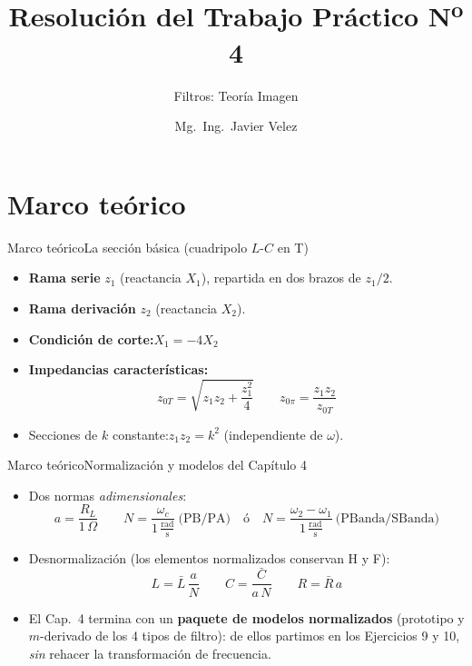 \documentclass[10pt, aspectratio=169]{beamer}
\title{Resolución del Trabajo Práctico N\textsuperscript{o} 4}
\subtitle{Filtros: Teoría Imagen}
\author{Mg.\ Ing.\ Javier Velez}
\institute{Teoría de Circuitos 2 --- UTN, Facultad Regional Mendoza}
\date{}
\begin{document}
\begin{frame}[plain]
  \titlepage
\end{frame}

\section{Marco teórico}

\begin{frame}{Marco teórico}{La sección básica (cuadripolo $L$-$C$ en T)}
  \begin{itemize}\setlength{\itemsep}{2ex}
    \item \textbf{Rama serie} $z_1$ (reactancia $X_1$), repartida en dos brazos de $z_1/2$.
    \item \textbf{Rama derivación} $z_2$ (reactancia $X_2$).
    \item \textbf{Condición de corte:}\quad $X_1 = -4X_2$
    \item \textbf{Impedancias características:}
    \[
        z_{0T} = \sqrt{z_1 z_2 + \frac{z_1^2}{4}}\qquad
        z_{0\pi} = \frac{z_1 z_2}{z_{0T}}
    \]
    \item Secciones de $k$ constante:\quad $z_1 z_2 = k^2$ (independiente de $\omega$).
  \end{itemize}
\end{frame}

\begin{frame}{Marco teórico}{Normalización y modelos del Capítulo 4}
  \begin{itemize}\setlength{\itemsep}{2ex}
    \item Dos normas \emph{adimensionales}:
    \[
        a = \frac{R_L}{1\,\Omega}\qquad
        N = \frac{\omega_c}{1\,\frac{\text{rad}}{\text{s}}}\ \text{(PB/PA)}
        \quad\text{ó}\quad
        N = \frac{\omega_2-\omega_1}{1\,\frac{\text{rad}}{\text{s}}}\ \text{(PBanda/SBanda)}
    \]
    \item Desnormalización (los elementos normalizados conservan H y F):
    \[
        \boxed{\;L = \bar L\,\frac{a}{N}\qquad C = \frac{\bar C}{a\,N}\qquad R = \bar R\,a\;}
    \]
    \item El Cap.~4 termina con un \textbf{paquete de modelos normalizados} (prototipo y
          $m$-derivado de los 4 tipos de filtro): de ellos partimos en los Ejercicios 9 y 10,
          \emph{sin} rehacer la transformación de frecuencia.
  \end{itemize}
\end{frame}
\end{document}
